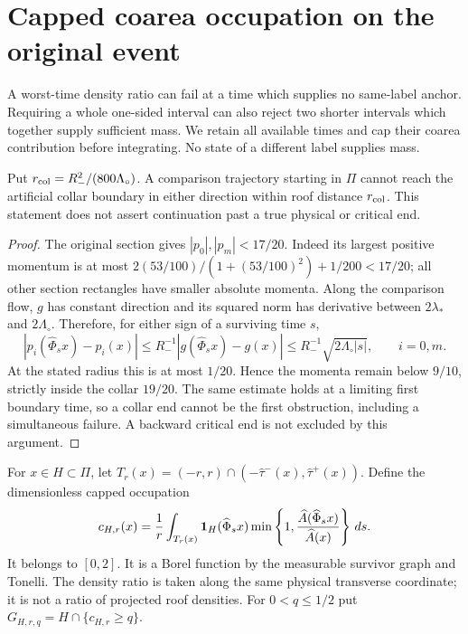 \section{Capped coarea occupation on the original event}
\label{sec:v97-capped}
A worst-time density ratio can fail at a time which supplies no
same-label anchor. Requiring a whole one-sided interval can also
reject two shorter intervals which together supply sufficient mass.
We retain all available times and cap their coarea contribution
before integrating. No state of a different label supplies mass.

\begin{lemma}
\label{lem:v97-collar}
Put $r_{\rm col}=R_-^2/(800\Lambda_\circ)$. A comparison trajectory
starting in $\Pi$ cannot reach the artificial collar boundary in
either direction within roof distance $r_{\rm col}$. This statement
does not assert continuation past a true physical or critical end.
\end{lemma}
\begin{proof}
The original section gives $|p_0|,|p_m|<17/20$. Indeed its largest
positive momentum is at most
$2(53/100)/(1+(53/100)^2)+1/200<17/20$; all other section
rectangles have smaller absolute momenta. Along the comparison flow,
$g$ has constant direction and its squared norm has derivative between
$2\lambda_*$ and $2\Lambda_\circ$. Therefore, for either sign of a
surviving time $s$,
\[
 |p_i(\widehat\Phi_sx)-p_i(x)|
 \le R_-^{-1}|g(\widehat\Phi_sx)-g(x)|
 \le R_-^{-1}\sqrt{2\Lambda_\circ|s|},\qquad i=0,m.
\]
At the stated radius this is at most $1/20$. Hence the momenta
remain below $9/10$, strictly inside the collar $19/20$.
The same estimate holds at a limiting first boundary time, so a
collar end cannot be the first obstruction, including a simultaneous
failure. A backward critical end is not excluded by this argument.
\end{proof}

For $x\in H\subset\Pi$, let
$T_r(x)=(-r,r)\cap(-\widehat\tau^-(x),\widehat\tau^+(x))$.
Define the dimensionless capped occupation
\begin{equation}\label{eq:v97-capped-clock}
 c_{H,r}(x)=\frac1r\int_{T_r(x)}
 \one_H(\widehat\Phi_sx)
 \min\left\{1,\frac{\widehat A(\widehat\Phi_sx)}{\widehat A(x)}\right\}\,ds.
\end{equation}
It belongs to $[0,2]$. It is a Borel function by the measurable
survivor graph and Tonelli. The density ratio is taken along the
same physical transverse coordinate; it is not a ratio of projected
roof densities. For $0<q\le1/2$ put $G_{H,r,q}=H\cap\{c_{H,r}\ge q\}$.

